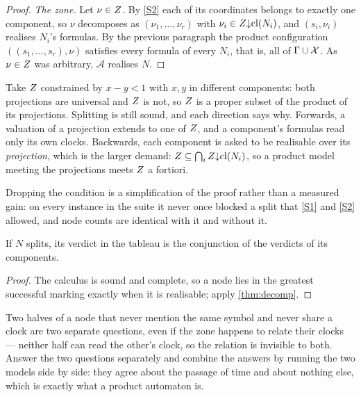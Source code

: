 \begin{proof}
\emph{The zone.} Let $\nu\in Z$. By \ref{S2} each of its coordinates belongs
to exactly one component, so $\nu$ decomposes as $(\nu_1,\dots,\nu_r)$ with
$\nu_i\in Z{\downarrow}\mathrm{cl}(N_i)$, and $(s_i,\nu_i)$ realises $N_i$'s
formulas. By the previous paragraph the product configuration
$((s_1,\dots,s_r),\nu)$ satisfies every formula of every $N_i$, that is, all of
$\Gamma\cup\mathcal{X}$. As $\nu\in Z$ was arbitrary, $\mathcal A$ realises $N$.
\end{proof}

\begin{remark}\label{rem:noproduct}
Take $Z$ constrained by $x-y<1$ with $x,y$ in different components: both
projections are universal and $Z$ is not, so $Z$ is a proper subset of
the product of its projections. Splitting is still sound, and each direction
says why. Forwards, a valuation of a projection extends to one of $Z$, and a
component's formulas read only its own clocks. Backwards, each component is
asked to be realisable over its \emph{projection}, which is the larger demand:
$Z\subseteq\bigcap_iZ{\downarrow}\mathrm{cl}(N_i)$, so a product model meeting
the projections meets $Z$ a fortiori.

Dropping the condition is a simplification of the proof rather than a
measured gain: on every instance in the suite it never once blocked a split
that \ref{S1} and \ref{S2} allowed, and node counts are identical with it and
without it.
\end{remark}

\begin{corollary}\label{cor:search}
If $N$ splits, its verdict in the tableau is the conjunction of the verdicts of
its components.
\end{corollary}

\begin{proof}
The calculus is sound and complete, so a node lies in the greatest successful
marking exactly when it is realisable; apply \cref{thm:decomp}.
\end{proof}

\begin{intuition}
Two halves of a node that never mention the same symbol and never share a clock
are two separate questions, even if the zone happens to relate their clocks ---
neither half can read the other's clock, so the relation is invisible to both.
Answer the two questions separately and combine the answers by running the two
models side by side: they agree about the passage of time and about nothing
else, which is exactly what a product automaton is.
\end{intuition}

